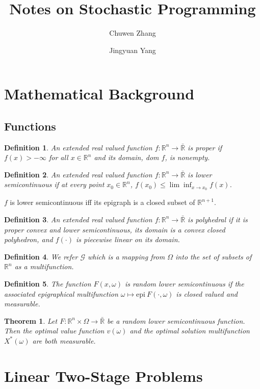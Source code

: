 \documentclass[a4pper,11pt]{article}
\title{Notes on Stochastic Programming}
\newtheorem{thm}{Theorem}[section]
\newtheorem{defn}{Definition}[section]
\begin{document}
\author[1]{\small Chuwen Zhang}
\author[1]{\small Jingyuan Yang}
\maketitle

\section{Mathematical Background}
\subsection{Functions}
\begin{defn}
    An extended real valued function $f: \mathbb R^n \to \bar {\mathbb R}$ is \textit{proper} if $f(x)>-\infty$ for all $x\in \mathbb R^n$ and its domain, dom $f$, is nonempty.
\end{defn}
\begin{defn}
    An extended real valued function $f: \mathbb R^n \to \bar {\mathbb R}$ is lower semicontinuous if at every point $x_0\in \mathbb R^n$, $f(x_0)\leq \lim \inf_{x\to x_0} f(x)$.
\end{defn}
$f$ is lower semicontinuous iff its epigraph is a closed subset of $\mathbb R^{n+1}$.
\begin{defn}
    An extended real valued function $f: \mathbb R^n \to \bar {\mathbb R}$ is polyhedral if it is proper convex and lower semicontinuous, its domain is a convex closed polyhedron, and $f(\cdot)$ is piecewise linear on its domain.
\end{defn}
\begin{defn}
    We refer $\mathscr G$ which is a mapping from $\Omega$ into the set of subsets of $\mathbb R^n$ as a multifunction.
\end{defn}
\begin{defn}
    The function $F(x,\omega)$ is random lower semicontinuous if the associated epigraphical multifunction $\omega \mapsto \text{epi} \ F(\cdot,\omega)$ is closed valued and measurable.
\end{defn}
\begin{thm}
    \label{thm-1}
    Let $F: \mathbb R^n \times \Omega \to \bar {\mathbb R}$ be a random lower semicontinuous function. Then the optimal value function $v(\omega)$ and the optimal solution multifunction $X^*(\omega)$ are both measurable.
\end{thm}
\section{Linear Two-Stage Problems}
\end{document}
